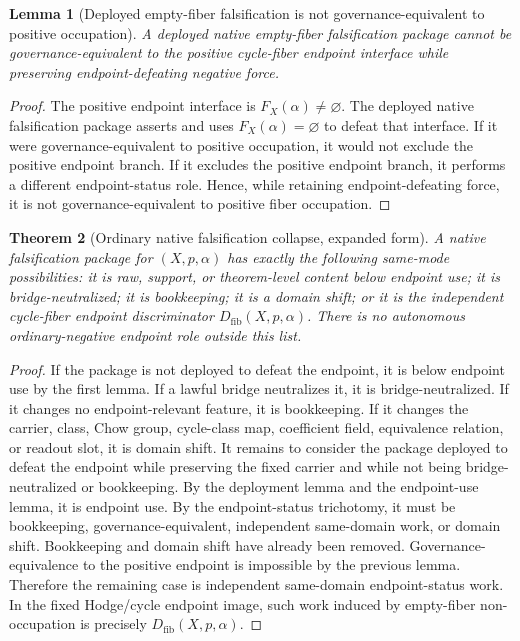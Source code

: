 \documentclass[11pt]{article}
\newtheorem{theorem}{Theorem}[section]
\newtheorem{lemma}[theorem]{Lemma}
\begin{document}
\begin{lemma}[Deployed empty-fiber falsification is not governance-equivalent to positive occupation]
A deployed native empty-fiber falsification package cannot be governance-equivalent to the positive cycle-fiber endpoint interface while preserving endpoint-defeating negative force.
\end{lemma}
\begin{proof}
The positive endpoint interface is $F_X(\alpha)\neq\varnothing$. The deployed native falsification package asserts and uses $F_X(\alpha)=\varnothing$ to defeat that interface. If it were governance-equivalent to positive occupation, it would not exclude the positive endpoint branch. If it excludes the positive endpoint branch, it performs a different endpoint-status role. Hence, while retaining endpoint-defeating force, it is not governance-equivalent to positive fiber occupation.
\end{proof}

\begin{theorem}[Ordinary native falsification collapse, expanded form]\label{thm:ordinary-native-collapse-expanded}
A native falsification package for $(X,p,\alpha)$ has exactly the following same-mode possibilities: it is raw, support, or theorem-level content below endpoint use; it is bridge-neutralized; it is bookkeeping; it is a domain shift; or it is the independent cycle-fiber endpoint discriminator $D_{\mathrm{fib}}(X,p,\alpha)$. There is no autonomous ordinary-negative endpoint role outside this list.
\end{theorem}
\begin{proof}
If the package is not deployed to defeat the endpoint, it is below endpoint use by the first lemma. If a lawful bridge neutralizes it, it is bridge-neutralized. If it changes no endpoint-relevant feature, it is bookkeeping. If it changes the carrier, class, Chow group, cycle-class map, coefficient field, equivalence relation, or readout slot, it is domain shift. It remains to consider the package deployed to defeat the endpoint while preserving the fixed carrier and while not being bridge-neutralized or bookkeeping. By the deployment lemma and the endpoint-use lemma, it is endpoint use. By the endpoint-status trichotomy, it must be bookkeeping, governance-equivalent, independent same-domain work, or domain shift. Bookkeeping and domain shift have already been removed. Governance-equivalence to the positive endpoint is impossible by the previous lemma. Therefore the remaining case is independent same-domain endpoint-status work. In the fixed Hodge/cycle endpoint image, such work induced by empty-fiber non-occupation is precisely $D_{\mathrm{fib}}(X,p,\alpha)$.
\end{proof}
\end{document}
